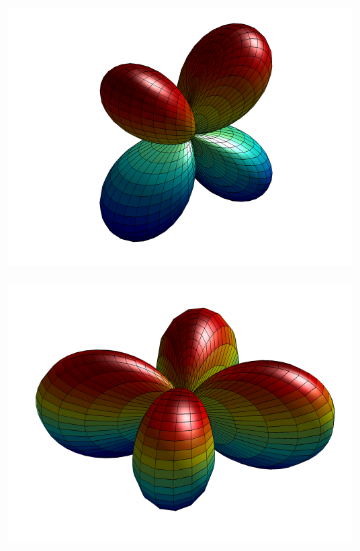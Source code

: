 \begin{figure}
\begin{subfigure}[b]{0.40\textwidth}
		\includegraphics[width=\textwidth]{figures/appendices/Y_2_1.png}
		\caption{}
	\end{subfigure}
	\vfill
	\begin{subfigure}[b]{0.40\textwidth}
		\centering
		\includegraphics[width=\textwidth]{figures/appendices/Y_2_-2.png}
		\caption{}
	\end{subfigure}
	\hfill
	\begin{subfigure}[b]{0.40\textwidth}
		\centering

\end{subfigure}
\end{figure}
